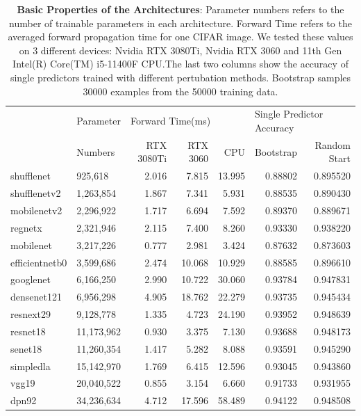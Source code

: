 \documentclass{article}
\begin{document}
\begin{table}[H]
\centering
\begin{tabular}{llrrrrr}
    \toprule
    {} &  Parameter & \multicolumn{3}{l}{Forward Time(ms)} & \multicolumn{2}{l}{Single Predictor Accuracy} \\
    {} &      Numbers &  RTX 3080Ti & RTX 3060 &     CPU &  Bootstrap & Random Start \\
    \midrule
    shufflenet     &     925,618 &       2.016 &    7.815 &  13.995 &    0.88802 &     0.895520 \\
    shufflenetv2   &   1,263,854 &       1.867 &    7.341 &   5.931 &    0.88535 &     0.890430 \\
    mobilenetv2    &   2,296,922 &       1.717 &    6.694 &   7.592 &    0.89370 &     0.889671 \\
    regnetx        &   2,321,946 &       2.115 &    7.400 &   8.260 &    0.93330 &     0.938220 \\
    mobilenet      &   3,217,226 &       0.777 &    2.981 &   3.424 &    0.87632 &     0.873603 \\
    efficientnetb0 &   3,599,686 &       2.474 &   10.068 &  10.929 &    0.88585 &     0.896610 \\
    googlenet      &   6,166,250 &       2.990 &   10.722 &  30.060 &    0.93784 &     0.947831 \\
    densenet121    &   6,956,298 &       4.905 &   18.762 &  22.279 &    0.93735 &     0.945434 \\
    resnext29      &   9,128,778 &       1.335 &    4.723 &  24.190 &    0.93952 &     0.948639 \\
    resnet18       &  11,173,962 &       0.930 &    3.375 &   7.130 &    0.93688 &     0.948173 \\
    senet18        &  11,260,354 &       1.417 &    5.282 &   8.088 &    0.93591 &     0.945290 \\
    simpledla      &  15,142,970 &       1.769 &    6.415 &  12.596 &    0.93045 &     0.943860 \\
    vgg19          &  20,040,522 &       0.855 &    3.154 &   6.660 &    0.91733 &     0.931955 \\
    dpn92          &  34,236,634 &       4.712 &   17.596 &  58.489 &    0.94122 &     0.948508 \\
    \bottomrule
\end{tabular}
\caption{\textbf{Basic Properties of the Architectures}: Parameter numbers refers to the number of trainable parameters in each architecture. Forward Time refers to the averaged forward propagation time for one CIFAR image. We tested these values on 3 different devices: Nvidia RTX 3080Ti, Nvidia RTX 3060 and 11th Gen Intel(R) Core(TM) i5-11400F CPU.The last two columns show the accuracy of single predictors trained with different pertubation methods. Bootstrap samples 30000 examples from the 50000 training data.}
\label{table:arc_basic}
\end{table}
\end{document}
